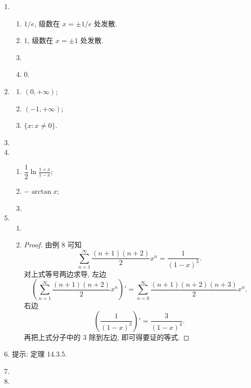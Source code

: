 % 
\begin{enumerate}
    \item %
        \begin{enumerate}[(1)]
            \item %
                $1/e$, 级数在 $x = \pm1/e$ 处发散.
            \item %
                $1$, 级数在 $x = \pm1$ 处发散.
            \item %
            \item %
                $0$.
        \end{enumerate}
    \item %
        \begin{multicols}{3}
            \begin{enumerate}[(1)]
                \item %
                    $(0, +\infty)$;
                \item %
                    $(-1, +\infty)$;
                \item %
                    $\{x: x \not=0\}$.
            \end{enumerate}
        \end{multicols}
    \item %
    \item %
        \begin{enumerate}[(1)]
            \item %
                $\dfrac{1}{2}\ln\frac{1+x}{1-x}$;
            \item %
                $-\arctan{x}$;
            \item %
        \end{enumerate}
    \item %
        \begin{enumerate}[(1)]
            \item %
            \item %
                \begin{proof}
                    由例 8 可知
                    \[
                        \sum_{n=1}^\infty\frac{(n+1)(n+2)}{2}x^n = \frac{1}{(1-x)^3}.    
                    \]
                    对上式等号两边求导, 左边
                    \[
                        \left(\sum_{n=1}^\infty\frac{(n+1)(n+2)}{2}x^n\right)' = \sum_{n=0}^\infty\frac{(n+1)(n+2)(n+3)}{2}x^n.    
                    \]
                    右边
                    \[
                        \left(\frac{1}{(1-x)^3}\right)' = \frac{3}{(1-x)^4}.    
                    \]
                    再把上式分子中的 $3$ 除到左边, 即可得要证的等式.
                \end{proof}
        \end{enumerate}
    \item %
        提示: 定理 14.3.5.
    \item %
    \item %
\end{enumerate}
% 
